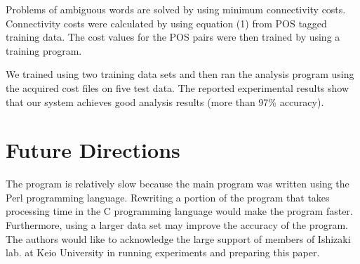 \documentclass[english]{nlp}
\begin{document}
Problems of ambiguous words are solved by using minimum connectivity 
costs. Connectivity costs were calculated by using equation (1) from
POS tagged training data. The cost values
for the POS pairs were then trained by using a training program.

We trained using two training data sets and
then ran the analysis program using the acquired cost files on five
test data.
The reported experimental results show that our system achieves good analysis results
(more than 97\% accuracy).

\section{Future Directions}
The program is relatively slow because the main program was written 
using the Perl programming language. Rewriting a portion of the 
program that takes processing time in the C programming language would 
make the program faster. Furthermore, using a larger data set may improve
the accuracy of the program.\\

\acknowledgment
The authors would like to acknowledge the large support of members 
of Ishizaki lab. at Keio University in running experiments and preparing 
this paper.
\end{document}

